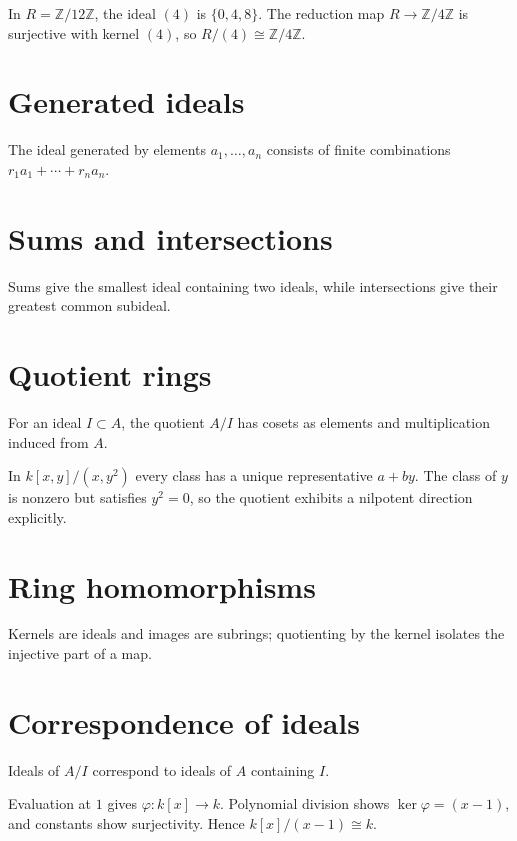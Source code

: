 \begin{example}\label{ex:v01-expand-01}
In $R=\mathbb Z/12\mathbb Z$, the ideal $(4)$ is $\{0,4,8\}$. The reduction map $R\to\mathbb Z/4\mathbb Z$ is surjective with kernel $(4)$, so $R/(4)\cong\mathbb Z/4\mathbb Z$.
\end{example}
\section{Generated ideals}
The ideal generated by elements $a_1,\dots,a_n$ consists of finite combinations $r_1a_1+\cdots+r_na_n$.

\section{Sums and intersections}
Sums give the smallest ideal containing two ideals, while intersections give their greatest common subideal.

\section{Quotient rings}
For an ideal $I\subset A$, the quotient $A/I$ has cosets as elements and multiplication induced from $A$.

\begin{example}\label{ex:v01-expand-02}
In $k[x,y]/(x,y^2)$ every class has a unique representative $a+by$. The class of $y$ is nonzero but satisfies $y^2=0$, so the quotient exhibits a nilpotent direction explicitly.
\end{example}
\section{Ring homomorphisms}
Kernels are ideals and images are subrings; quotienting by the kernel isolates the injective part of a map.

\section{Correspondence of ideals}
Ideals of $A/I$ correspond to ideals of $A$ containing $I$.

\begin{example}\label{ex:v01-expand-03}
Evaluation at $1$ gives $\varphi:k[x]\to k$. Polynomial division shows $\ker\varphi=(x-1)$, and constants show surjectivity. Hence $k[x]/(x-1)\cong k$.
\end{example}
